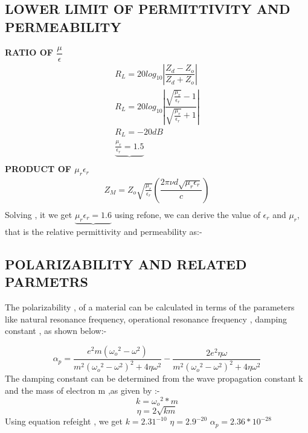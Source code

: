 \documentclass[journal]{IEEEtran}
\begin{document}

\subsection{LOWER LIMIT OF  PERMITTIVITY AND PERMEABILITY}

\textbf{RATIO OF $\dfrac{\mu}{\epsilon}$}
\begin{align}
R_L = 20 log_{10} |\dfrac{Z_d - Z_o}{Z_d + Z_o}| \\
R_L = 20 log_10 |\dfrac{\sqrt{\frac{\mu_r}{\epsilon_r}} - 1}{\sqrt{\frac{\mu_r}{\epsilon_r}} +1 }|  \\
R_L = -20 dB \\
\underbrace{\frac{\mu_r}{\epsilon_r} = 1.5 }\\
\end{align}
\textbf{PRODUCT OF $\mu_r \epsilon_r$}
\begin{align}
Z_M = Z_o  \sqrt{\frac{\mu_r}{\epsilon_r}} (\dfrac{2 \pi \nu d \sqrt{\mu_r \epsilon_r}}{c}) \\
\end{align}
Solving , it we get 
$\underbrace{\mu_r \epsilon_r = 1.6}$
using ref{one}, we can derive the value of $\epsilon_r$ and $\mu_r$, that is the relative permittivity and permeability as:-


\subsection{POLARIZABILITY AND RELATED PARMETRS }

The polarizability , of a material can be calculated in terms of the parameters like natural resonance frequency, operational resonance frequency , damping constant , as shown below:-

\begin{equation} \label{eight}
{\alpha}_p = \dfrac{e^2 m ({\omega_o}^2 - {\omega}^2)}{m^2({\omega_o}^2 - {\omega}^2)^2 + 4 \eta \omega^2} - \dfrac{2 e^2 \eta \omega}{m^2({\omega_o}^2 - {\omega}^2)^2 + 4 \eta \omega^2}
\end{equation}
The damping constant can be determined from the wave propagation constant k and the mass of electron m ,as given by :-
$$k = {\omega_o}^2*m$$
\begin{equation}
\eta = 2 \sqrt{km}
\end{equation}
Using equation ref{eight} , we get 
$k = 2.31^{-10}$
$\eta = 2.9^{-20}$
${\alpha}_p = 2.36*10^{-28}$
\end{document}
